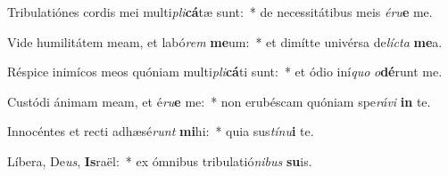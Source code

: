 \item Tribulatiónes cordis mei multi\textit{pli}\textbf{cá}tæ sunt:~* de necessitátibus meis \textit{é}\textit{ru}\textbf{e} me.
\item Vide humilitátem meam, et labó\textit{rem} \textbf{me}um:~* et dimítte univérsa de\textit{líc}\textit{ta} \textbf{me}a.
\item Réspice inimícos meos quóniam multi\textit{pli}\textbf{cá}ti sunt:~* et ódio iní\textit{quo} \textit{o}\textbf{dé}runt me.
\item Custódi ánimam meam, et é\textit{ru}\textbf{e} me:~* non erubéscam quóniam spe\textit{rá}\textit{vi} \textbf{in} te.
\item Innocéntes et recti adhæsé\textit{runt} \textbf{mi}hi:~* quia sus\textit{tí}\textit{nu}\textbf{i} te.
\item Líbera, De\textit{us}, \textbf{Is}raël:~* ex ómnibus tribulatió\textit{ni}\textit{bus} \textbf{su}is.
